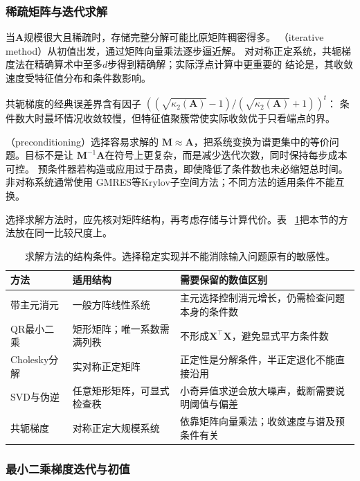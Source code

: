 \subsubsection{稀疏矩阵与迭代求解}

当$\bm{A}$规模很大且稀疏时，存储完整分解可能比原矩阵稠密得多。
（iterative method）从初值出发，通过矩阵向量乘法逐步逼近解。
对对称正定系统，共轭梯度法在精确算术中至多$d$步得到精确解；实际浮点计算中更重要的
结论是，其收敛速度受特征值分布和条件数影响。

共轭梯度的经典误差界含有因子
$((\sqrt{\kappa_2(\bm{A})}-1)/(\sqrt{\kappa_2(\bm{A})}+1))^t$：
条件数大时最坏情况收敛较慢，但特征值聚簇常使实际收敛优于只看端点的界。

（preconditioning）选择容易求解的
$\bm{M}\approx\bm{A}$，把系统变换为谱更集中的等价问题。目标不是让
$\bm{M}^{-1}\bm{A}$在符号上更复杂，而是减少迭代次数，同时保持每步成本可控。
预条件器若构造或应用过于昂贵，即使降低了条件数也未必缩短总时间。非对称系统通常使用
GMRES等Krylov子空间方法；不同方法的适用条件不能互换。

选择求解方法时，应先核对矩阵结构，再考虑存储与计算代价。表
~\ref{tab:matrix-analysis-solver-conditions}把本节的方法放在同一比较尺度上。

\begin{table}[htbp]
 \centering\small
 \begin{tabularx}{\linewidth}{@{}lXX@{}}
 \toprule
 方法 & 适用结构 & 需要保留的数值区别\\
 \midrule
 带主元消元 & 一般方阵线性系统 & 主元选择控制消元增长，仍需检查问题本身的条件数\\
 QR最小二乘 & 矩形矩阵；唯一系数需满列秩 & 不形成$\bm X^{\top}\bm X$，避免显式平方条件数\\
 Cholesky分解 & 实对称正定矩阵 & 正定性是分解条件，半正定退化不能直接沿用\\
 SVD与伪逆 & 任意矩形矩阵，可显式检查秩 & 小奇异值求逆会放大噪声，截断需要说明阈值与偏差\\
 共轭梯度 & 对称正定大规模系统 & 依靠矩阵向量乘法；收敛速度与谱及预条件有关\\
 \bottomrule
 \end{tabularx}
 \caption{求解方法的结构条件。选择稳定实现并不能消除输入问题原有的敏感性。}
 \label{tab:matrix-analysis-solver-conditions}
\end{table}

\subsubsection{最小二乘梯度迭代与初值}

